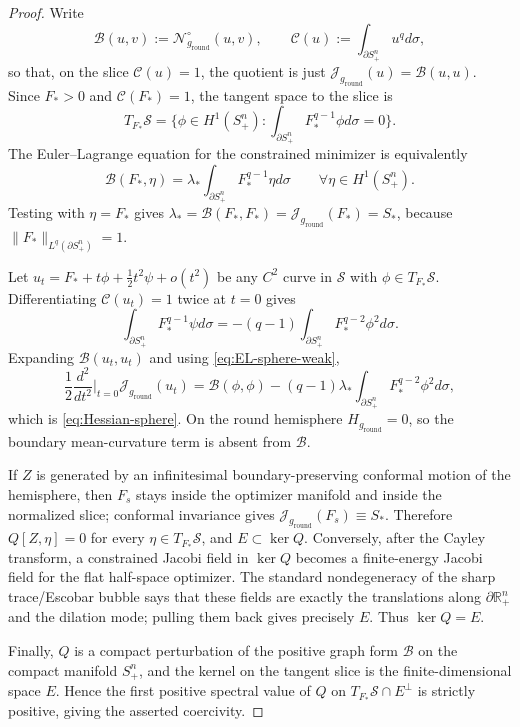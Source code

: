 \documentclass[11pt,reqno,a4paper]{amsart}
\newcommand{\R}{\mathbb{R}}
\numberwithin{equation}{section}
\theoremstyle{plain}
\theoremstyle{remark}
\theoremstyle{plain}
\begin{document}
\begin{proof}
Write
\[
\mathcal B(u,v):=\mathcal N^\circ_{g_{\mathrm{round}}}(u,v),
\qquad
\mathcal C(u):=\int_{\partial S^n_+}u^qd\sigma,
\]
so that, on the slice $\mathcal C(u)=1$, the quotient is just
$\mathcal J_{g_{\mathrm{round}}}(u)=\mathcal B(u,u)$.  Since
$F_\ast>0$ and $\mathcal C(F_\ast)=1$, the tangent space to the slice is
\[
T_{F_\ast}\mathcal S
=\Big\{\phi\in H^1(S^n_+):
\int_{\partial S^n_+}F_\ast^{q-1}\phi d\sigma=0\Big\}.
\]
The Euler--Lagrange equation for the constrained minimizer is equivalently
\begin{equation}\label{eq:EL-sphere-weak}
\mathcal B(F_\ast,\eta)
=\lambda_\ast\int_{\partial S^n_+}F_\ast^{q-1}\eta d\sigma
\qquad\forall\eta\in H^1(S^n_+).
\end{equation}
Testing with $\eta=F_\ast$ gives
$\lambda_\ast=\mathcal B(F_\ast,F_\ast)=\mathcal J_{g_{\mathrm{round}}}(F_\ast)=S_\ast$,
because $\|F_\ast\|_{L^q(\partial S^n_+)}=1$.

Let $u_t=F_\ast+t\phi+\frac12t^2\psi+o(t^2)$ be any $C^2$ curve in
$\mathcal S$ with $\phi\in T_{F_\ast}\mathcal S$.  Differentiating
$\mathcal C(u_t)=1$ twice at $t=0$ gives
\[
\int_{\partial S^n_+}F_\ast^{q-1}\psi d\sigma
=-(q-1)\int_{\partial S^n_+}F_\ast^{q-2}\phi^2d\sigma.
\]
Expanding $\mathcal B(u_t,u_t)$ and using \eqref{eq:EL-sphere-weak},
\[
\frac12\frac{d^2}{dt^2}\Big|_{t=0}\mathcal J_{g_{\mathrm{round}}}(u_t)
=\mathcal B(\phi,\phi)
-(q-1)\lambda_\ast\int_{\partial S^n_+}F_\ast^{q-2}\phi^2d\sigma,
\]
which is \eqref{eq:Hessian-sphere}.  On the round hemisphere
$H_{g_{\mathrm{round}}}=0$, so the boundary mean-curvature term is absent from
$\mathcal B$.

If $Z$ is generated by an infinitesimal boundary-preserving conformal motion of the
hemisphere, then $F_s$ stays inside the optimizer manifold and inside the normalized slice;
conformal invariance gives $\mathcal J_{g_{\mathrm{round}}}(F_s)\equiv S_\ast$.  Therefore
$Q[Z,\eta]=0$ for every $\eta\in T_{F_\ast}\mathcal S$, and $E\subset\ker Q$.
Conversely, after the Cayley transform, a constrained Jacobi field in $\ker Q$ becomes a
finite-energy Jacobi field for the flat half-space optimizer.  The standard
nondegeneracy of the sharp trace/Escobar bubble says that these fields are exactly the
translations along $\partial\R^n_+$ and the dilation mode; pulling them back gives precisely
$E$.  Thus $\ker Q=E$.

Finally, $Q$ is a compact perturbation of the positive graph form $\mathcal B$ on the compact
manifold $S^n_+$, and the kernel on the tangent slice is the finite-dimensional space $E$.
Hence the first positive spectral value of $Q$ on
$T_{F_\ast}\mathcal S\cap E^\perp$ is strictly positive, giving the asserted coercivity.
\end{proof}
\end{document}
